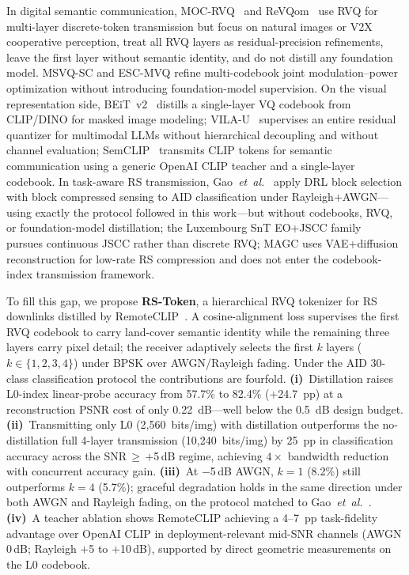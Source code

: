 \documentclass[lettersize,journal]{IEEEtran}
\begin{document}
In digital semantic communication, MOC-RVQ~\cite{moc-rvq} and ReVQom~\cite{revqom} use RVQ for multi-layer discrete-token transmission but focus on natural images or V2X cooperative perception, treat all RVQ layers as residual-precision refinements, leave the first layer without semantic identity, and do not distill any foundation model. MSVQ-SC and ESC-MVQ refine multi-codebook joint modulation--power optimization without introducing foundation-model supervision. On the visual representation side, BEiT~v2~\cite{beitv2} distills a single-layer VQ codebook from CLIP/DINO for masked image modeling; VILA-U~\cite{vilau} supervises an entire residual quantizer for multimodal LLMs without hierarchical decoupling and without channel evaluation; SemCLIP~\cite{semclip} transmits CLIP tokens for semantic communication using a generic OpenAI CLIP teacher and a single-layer codebook. In task-aware RS transmission, Gao~\textit{et~al.}~\cite{gao2022task} apply DRL block selection with block compressed sensing to AID classification under Rayleigh+AWGN---using exactly the protocol followed in this work---but without codebooks, RVQ, or foundation-model distillation; the Luxembourg SnT EO+JSCC family~\cite{deepjscc} pursues continuous JSCC rather than discrete RVQ; MAGC uses VAE+diffusion reconstruction for low-rate RS compression and does not enter the codebook-index transmission framework.

To fill this gap, we propose \textbf{RS-Token}, a hierarchical RVQ tokenizer for RS downlinks distilled by RemoteCLIP~\cite{liu2024remoteclip}. A cosine-alignment loss supervises the first RVQ codebook to carry land-cover semantic identity while the remaining three layers carry pixel detail; the receiver adaptively selects the first $k$ layers ($k\in\{1,2,3,4\}$) under BPSK over AWGN/Rayleigh fading. Under the AID 30-class classification protocol the contributions are fourfold. \textbf{(i)}~Distillation raises L0-index linear-probe accuracy from 57.7\% to 82.4\% (+24.7~pp) at a reconstruction PSNR cost of only 0.22~dB---well below the 0.5~dB design budget. \textbf{(ii)}~Transmitting only L0 (2{,}560~bits/img) with distillation outperforms the no-distillation full 4-layer transmission (10{,}240~bits/img) by 25~pp in classification accuracy across the SNR\,$\geq$\,$+$5\,dB regime, achieving $4\times$ bandwidth reduction with concurrent accuracy gain. \textbf{(iii)}~At $-$5\,dB AWGN, $k=1$ (8.2\%) still outperforms $k=4$ (5.7\%); graceful degradation holds in the same direction under both AWGN and Rayleigh fading, on the protocol matched to Gao~\textit{et~al.}~\cite{gao2022task}. \textbf{(iv)}~A teacher ablation shows RemoteCLIP achieving a 4--7~pp task-fidelity advantage over OpenAI CLIP in deployment-relevant mid-SNR channels (AWGN 0\,dB; Rayleigh $+$5 to $+$10\,dB), supported by direct geometric measurements on the L0 codebook.
\end{document}
